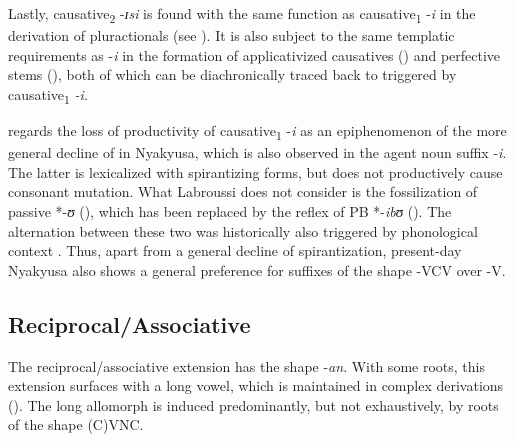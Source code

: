 Lastly, causative\textsubscript{2} -\textit{ɪsi} is found with the same function as causative\textsubscript{1} -\textit{i} in the derivation of pluractionals (see ). It is also subject to the same templatic requirements as -\textit{i} in the formation of applicativized causatives () and perfective stems (), both of which can be diachronically traced back to  triggered by causative\textsubscript{1} \textit{-i}.

\citet{LabroussiC1999} regards the loss of productivity of causative\textsubscript{1} -\textit{i} as an epiphenomenon of the more general decline of  in Nyakyusa, which is also observed in the agent noun suffix -\textit{i}. The latter is lexicalized with spirantizing forms, but does not productively cause consonant mutation. What Labroussi does not consider is the fossilization of passive *-\textit{ʊ} (), which has been replaced by the reflex of PB *-\textit{ibʊ} (). The alternation between these two was historically also triggered by phonological context \citep[78]{SchadebergT2003a}. Thus, apart from a general decline of spirantization, present-day Nyakyusa also shows a general preference for suffixes of the shape -VCV over -V.
\subsection{Reciprocal/Associative}
\label{Reciprocal}
The reciprocal/associative extension has the shape -\textit{an}. With some roots, this extension surfaces with a long vowel, which is maintained in complex derivations (). The long allomorph is induced predominantly, but not exhaustively, by roots of the shape (C)VNC.


